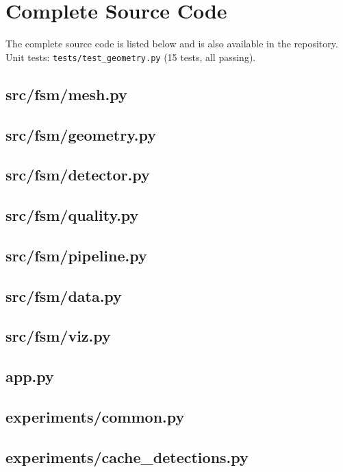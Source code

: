 \section{Complete Source Code}
\label{sec:code}
The complete source code is listed below and is also available in the repository. Unit
tests: \texttt{tests/test\_geometry.py} (15 tests, all passing).

\onecolumn
\subsection*{src/fsm/mesh.py}
\subsection*{src/fsm/geometry.py}
\subsection*{src/fsm/detector.py}
\subsection*{src/fsm/quality.py}
\subsection*{src/fsm/pipeline.py}
\subsection*{src/fsm/data.py}
\subsection*{src/fsm/viz.py}
\subsection*{app.py}
\subsection*{experiments/common.py}
\subsection*{experiments/cache\_detections.py}
